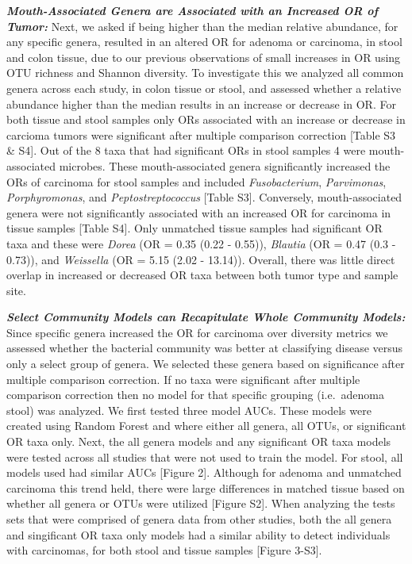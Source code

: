 \documentclass[12pt,]{article}
\begin{document}
\textbf{\emph{Mouth-Associated Genera are Associated with an Increased
OR of Tumor:}} Next, we asked if being higher than the median relative
abundance, for any specific genera, resulted in an altered OR for
adenoma or carcinoma, in stool and colon tissue, due to our previous
observations of small increases in OR using OTU richness and Shannon
diversity. To investigate this we analyzed all common genera across each
study, in colon tissue or stool, and assessed whether a relative
abundance higher than the median results in an increase or decrease in
OR. For both tissue and stool samples only ORs associated with an
increase or decrease in carcioma tumors were significant after multiple
comparison correction {[}Table S3 \& S4{]}. Out of the 8 taxa that had
significant ORs in stool samples 4 were mouth-associated microbes. These
mouth-associated genera significantly increased the ORs of carcinoma for
stool samples and included \emph{Fusobacterium}, \emph{Parvimonas},
\emph{Porphyromonas}, and \emph{Peptostreptococcus} {[}Table S3{]}.
Conversely, mouth-associated genera were not significantly associated
with an increased OR for carcinoma in tissue samples {[}Table S4{]}.
Only unmatched tissue samples had significant OR taxa and these were
\emph{Dorea} (OR = 0.35 (0.22 - 0.55)), \emph{Blautia} (OR = 0.47 (0.3 -
0.73)), and \emph{Weissella} (OR = 5.15 (2.02 - 13.14)). Overall, there
was little direct overlap in increased or decreased OR taxa between both
tumor type and sample site.

\textbf{\emph{Select Community Models can Recapitulate Whole Community
Models:}} Since specific genera increased the OR for carcinoma over
diversity metrics we assessed whether the bacterial community was better
at classifying disease versus only a select group of genera. We selected
these genera based on significance after multiple comparison correction.
If no taxa were significant after multiple comparison correction then no
model for that specific grouping (i.e.~adenoma stool) was analyzed. We
first tested three model AUCs. These models were created using Random
Forest and where either all genera, all OTUs, or significant OR taxa
only. Next, the all genera models and any significant OR taxa models
were tested across all studies that were not used to train the model.
For stool, all models used had similar AUCs {[}Figure 2{]}. Although for
adenoma and unmatched carcinoma this trend held, there were large
differences in matched tissue based on whether all genera or OTUs were
utilized {[}Figure S2{]}. When analyzing the tests sets that were
comprised of genera data from other studies, both the all genera and
singificant OR taxa only models had a similar ability to detect
individuals with carcinomas, for both stool and tissue samples {[}Figure
3-S3{]}.
\end{document}

